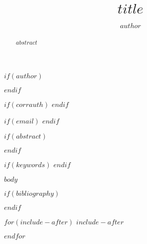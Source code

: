 \documentclass[$for(classoption)$$classoption$,$endfor$]{sagej}
\begin{document}
\title{$title$}


$if(author)$
\author{$author$}
$endif$

$if(corrauth)$
$endif$

$if(email)$
$endif$

$if(abstract)$
\begin{abstract}
$abstract$
\end{abstract}
$endif$

$if(keywords)$
$endif$

\maketitle

$body$

$if(bibliography)$


$endif$

$for(include-after)$
$include-after$

$endfor$
\end{document}

